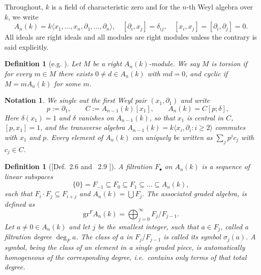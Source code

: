 \documentclass[pdflatex,sn-mathphys-num]{sn-jnl}
\numberwithin{equation}{section}
\theoremstyle{thmstyleone}
\newtheorem{definition}[theorem]{Definition}
\newtheorem{convention}[theorem]{Notation}
\theoremstyle{thmstyletwo}
\begin{document}
Throughout, $k$ is a field of characteristic zero and for the $n$-th Weyl algebra over $k$, we write
\[ A_n(k)=k\langle x_1,\dots,x_n,\partial_1,\dots,\partial_n\rangle,
  \quad [\partial_i,x_j]=\delta_{ij},\quad [x_i,x_j]=[\partial_i,\partial_j]=0 .\]
All ideals are right ideals and all modules are right modules
unless the contrary is said explicitly.
\begin{definition}[e.g. \cite{coutinho}]\label{def:cyclic}
Let $M$ be a right $A_n(k)$-module. We say $M$ is \emph{torsion} if for every $m\in M$ there exists
$0\ne d\in A_n(k)$ with $md=0$, and \emph{cyclic} if $M=mA_n(k)$ for some $m$. 
\end{definition}
\begin{convention}\label{conv:pair}
We single out the first Weyl pair $(x_1, \partial_1)$ and write
\[\qquad p:=\partial_1,\qquad
  C:=A_{n-1}(k)[x_1],\qquad A_n(k)=C[p;\delta],\]
Here $\delta(x_1)=1$ and $\delta$ vanishes on $A_{n-1}(k)$,
so that $x_1$ is central in $C$, $[p,x_1] = 1$, and the \emph{transverse algebra} $A_{n-1}(k)=k\langle x_i,\partial_i : i\ge2\rangle$ commutes with $x_1$ and $p$.
Every element of $A_n(k)$ can uniquely be written as $\sum_j p^j c_j$ with $c_j\in C$. \cite[Prop. 1.2.1]{coutinho}
\end{convention}


\begin{definition}[{[Def.~2.6 and ~2.9 \cite{SchnellNotes}]}]\label{def:filtration}
A filtration $F_\bullet$ on $A_n(k)$ is a sequence of linear subspaces
\[\{0\} = F_{-1} \subseteq F_0 \subseteq F_1\subseteq...\subseteq A_n(k),\]
such that $F_i\cdot F_j \subseteq F_{i+j}$ and $A_n(k) = \bigcup F_j.$
The associated graded algebra, is defined as
\[\mathrm{gr}^F A_n(k) = \bigoplus_{j = 0}^\infty F_j/F_{j-1}.\]
Let $a\neq 0 \in A_n(k)$ and let $j$ be the smallest integer, such that $a \in F_j$, called a \emph{filtration degree} $\deg_F a$. The class of $a$ in $F_j/F_{j-1}$ is called its \emph{symbol} $\sigma_j(a)$. A symbol, being the class of an element in a single graded piece, is automatically homogeneous of the corresponding
degree, i.e.\ contains only terms of that total degree.
\end{definition}
\end{document}
